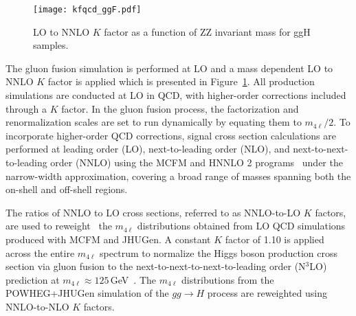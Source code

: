 
\begin{figure}[!hbt]
\centering
\texttt{[image: kfqcd\_ggF.pdf]}
\caption {LO to NNLO $K$ factor as a function of ZZ invariant mass for ggH samples.}
\label{fig:kfggf}
\end{figure}

The gluon fusion simulation is performed at LO and a mass dependent LO to NNLO $K$ factor is applied which is presented in Figure~\ref{fig:kfggf}. 
All \offshell production simulations are conducted at LO in QCD, with higher-order corrections 
included through a $K$ factor. In the gluon fusion process, the factorization and renormalization scales are set to run dynamically by equating them to $m_{4\ell}/2$. To incorporate higher-order QCD corrections, signal cross section calculations are performed at leading order (LO), next-to-leading order (NLO), and next-to-next-to-leading order (NNLO) using the MCFM and HNNLO 2 programs~\cite{Catani:2007vq,Grazzini:2008tf,Grazzini:2013mca} under the narrow-width approximation, covering a broad range of masses spanning both the on-shell and off-shell regions.

The ratios of NNLO to LO cross sections, referred to as NNLO-to-LO $K$ factors, are used to reweight~\cite{deFlorian:2016spz} the $m_{4\ell}$ distributions obtained from LO QCD simulations produced with MCFM and JHUGen. A constant $K$ factor of 1.10 is applied across the entire $m_{4\ell}$ spectrum to normalize the Higgs boson production cross section via gluon fusion to the next-to-next-to-next-to-leading order (N$^3$LO) prediction at $m_{4\ell} \approx 125$\,GeV~\cite{deFlorian:2016spz}. The $m_{4\ell}$ distributions from the POWHEG+JHUGen simulation of the $gg \to H$ process are reweighted using NNLO-to-NLO $K$ factors.

